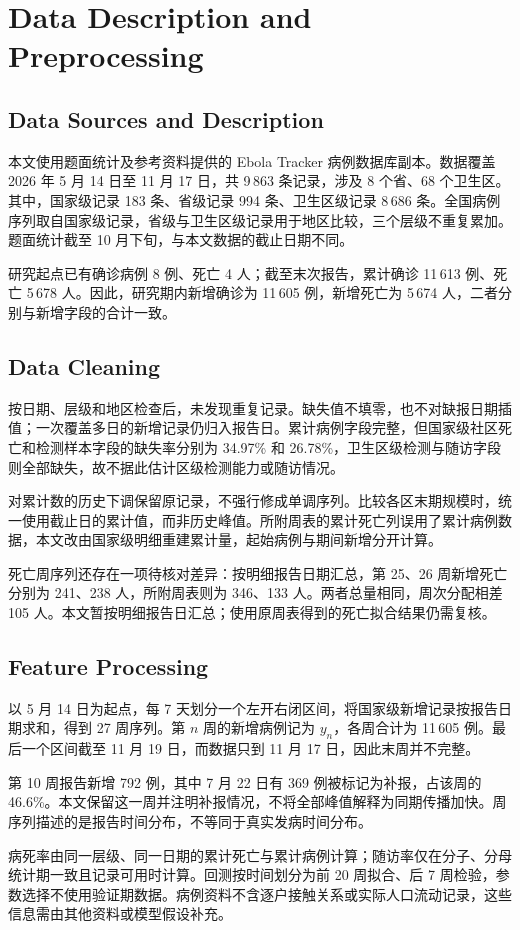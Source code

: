 \section{Data Description and Preprocessing}
\label{sec:data}

\subsection{Data Sources and Description}

本文使用题面统计及参考资料提供的 Ebola Tracker 病例数据库副本\cite{eboladatabase}。数据覆盖 2026 年 5 月 14 日至 11 月 17 日，共 9\,863 条记录，涉及 8 个省、68 个卫生区。其中，国家级记录 183 条、省级记录 994 条、卫生区级记录 8\,686 条。全国病例序列取自国家级记录，省级与卫生区级记录用于地区比较，三个层级不重复累加。题面统计截至 10 月下旬，与本文数据的截止日期不同。

研究起点已有确诊病例 8 例、死亡 4 人；截至末次报告，累计确诊 11\,613 例、死亡 5\,678 人。因此，研究期内新增确诊为 11\,605 例，新增死亡为 5\,674 人，二者分别与新增字段的合计一致。

\subsection{Data Cleaning}

按日期、层级和地区检查后，未发现重复记录。缺失值不填零，也不对缺报日期插值；一次覆盖多日的新增记录仍归入报告日。累计病例字段完整，但国家级社区死亡和检测样本字段的缺失率分别为 34.97\% 和 26.78\%，卫生区级检测与随访字段则全部缺失，故不据此估计区级检测能力或随访情况。

对累计数的历史下调保留原记录，不强行修成单调序列。比较各区末期规模时，统一使用截止日的累计值，而非历史峰值。所附周表的累计死亡列误用了累计病例数据，本文改由国家级明细重建累计量，起始病例与期间新增分开计算。

死亡周序列还存在一项待核对差异：按明细报告日期汇总，第 25、26 周新增死亡分别为 241、238 人，所附周表则为 346、133 人。两者总量相同，周次分配相差 105 人。本文暂按明细报告日汇总；使用原周表得到的死亡拟合结果仍需复核。

\subsection{Feature Processing}

以 5 月 14 日为起点，每 7 天划分一个左开右闭区间，将国家级新增记录按报告日期求和，得到 27 周序列。第 $n$ 周的新增病例记为 $y_n$，各周合计为 11\,605 例。最后一个区间截至 11 月 19 日，而数据只到 11 月 17 日，因此末周并不完整。

第 10 周报告新增 792 例，其中 7 月 22 日有 369 例被标记为补报，占该周的 46.6\%。本文保留这一周并注明补报情况，不将全部峰值解释为同期传播加快。周序列描述的是报告时间分布，不等同于真实发病时间分布。

病死率由同一层级、同一日期的累计死亡与累计病例计算；随访率仅在分子、分母统计期一致且记录可用时计算。回测按时间划分为前 20 周拟合、后 7 周检验，参数选择不使用验证期数据。病例资料不含逐户接触关系或实际人口流动记录，这些信息需由其他资料或模型假设补充。
